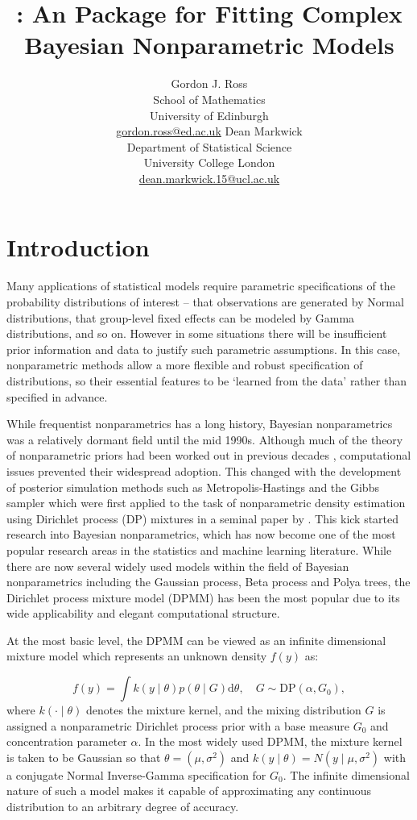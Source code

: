\documentclass[nojss]{jss}
\author{Gordon J. Ross\\School of Mathematics\\University of Edinburgh\\\href{Gordon.Ross@ed.ac.uk}{gordon.ross@ed.ac.uk} \And
Dean Markwick\\Department of Statistical Science\\University College London\\\href{dean.markwick.15@ucl.ac.uk}{dean.markwick.15@ucl.ac.uk}}
\title{\pkg{dirichletprocess}: An \proglang{R} Package for Fitting Complex Bayesian Nonparametric Models}
\begin{document}
\section[Introduction]{Introduction} \label{sec:intro}

Many applications of statistical models require parametric specifications of the probability distributions of interest -- that observations are generated by Normal distributions, that group-level fixed effects can be modeled by Gamma distributions, and so on. However in some situations there will be insufficient prior information and data to justify such parametric assumptions. In this case, nonparametric methods allow a more flexible and robust specification of distributions, so their  essential features to be `learned from the data' rather than specified in advance.

While frequentist nonparametrics has a long history, Bayesian nonparametrics was a relatively dormant field until the mid 1990s. Although much of the theory of nonparametric priors had been worked out in previous decades \citep{ferguson_bayesian_1973}, computational issues prevented their widespread adoption. This changed with the development of posterior simulation methods such as Metropolis-Hastings \citep{hastings_monte_1970} and the Gibbs sampler \citep{geman_stochastic_1984} which were first applied to the task of nonparametric density estimation using Dirichlet process (DP) mixtures in a seminal paper by \cite{escobar_bayesian_1995}. This kick started research into Bayesian nonparametrics, which has now become one of the most popular research areas in the statistics and machine learning literature. While there are now several widely used models within the field of Bayesian nonparametrics including the Gaussian process, Beta process and Polya trees, the Dirichlet process mixture model (DPMM) has been the most popular due to its wide applicability and elegant computational structure.

At the most basic level, the DPMM can be viewed as an infinite dimensional mixture model which represents an unknown density $f(y)$ as:

\begin{equation}
f(y) = \int k(y \mid \theta) p(\theta \mid G) \mathrm{d} \theta, \quad G \sim \text{DP}(\alpha, G_0),
\end{equation}
where $k(\cdot \mid \theta)$ denotes the mixture kernel, and the mixing distribution $G$ is assigned a nonparametric Dirichlet process prior with a base measure $G_0$ and concentration parameter $\alpha$. In the most widely used DPMM, the mixture kernel is taken to be Gaussian so that $\theta = (\mu,\sigma^2)$ and $k(y\mid\theta) = N(y\mid \mu,\sigma^2)$ with a conjugate Normal Inverse-Gamma specification for $G_0$. The infinite dimensional nature of such a model makes it capable of approximating any continuous distribution to an arbitrary degree of accuracy.
\end{document}

